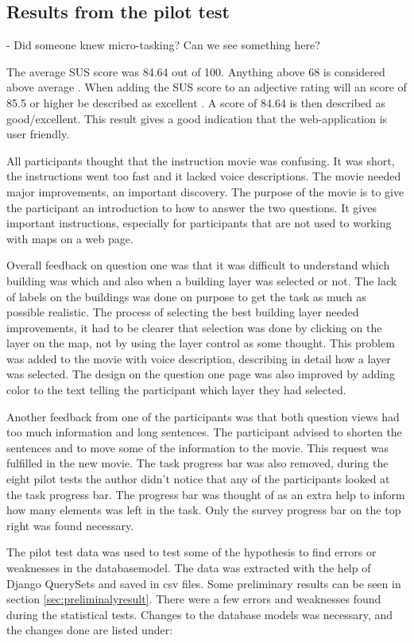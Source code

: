 \subsection{Results from the pilot test}

- Did someone knew micro-tasking? Can we see something here?

The average SUS score was 84.64 out of 100. Anything above 68 is considered above average \citep{Affairs2013}. When adding the SUS score to an adjective rating will an score of 85.5 or higher be described as excellent \citep{Bangor2009}. A score of 84.64 is then described as good/excellent. This result gives a good indication that the web-application is user friendly. 

All participants thought that the instruction movie was confusing. It was short, the instructions went too fast and it lacked voice descriptions. The movie needed major improvements, an important discovery. The purpose of the movie is to give the participant an introduction to how to answer the two questions. It gives important instructions, especially for participants that are not used to working with maps on a web page. 

Overall feedback on question one was that it was difficult to understand which building was which and also when a building layer was selected or not. The lack of labels on the buildings was done on purpose to get the task as much as possible realistic. The process of selecting the best building layer needed improvements, it had to be clearer that selection was done by clicking on the layer on the map, not by using the layer control as some thought. This problem was added to the movie with voice description, describing in detail how a layer was selected. The design on the question one page was also improved by adding color to the text telling the participant which layer they had selected. 

Another feedback from one of the participants was that both question views had too much information and long sentences. The participant advised to shorten the sentences and to move some of the information to the movie. This request was fulfilled in the new movie. The task progress bar was also removed, during the eight pilot tests the author didn't notice that any of the participants looked at the task progress bar. The progress bar was thought of as an extra help to inform how many elements was left in the task. Only the survey progress bar on the top right was found necessary. 

The pilot test data was used to test some of the hypothesis to find errors or weaknesses in the databasemodel. The data was extracted with the help of Django QuerySets and saved in csv files. Some preliminary results can be seen in section \ref{sec:preliminalyresult}. There were a few errors and weaknesses found during the statistical tests. Changes to the database models was necessary, and the changes done are listed under: 

